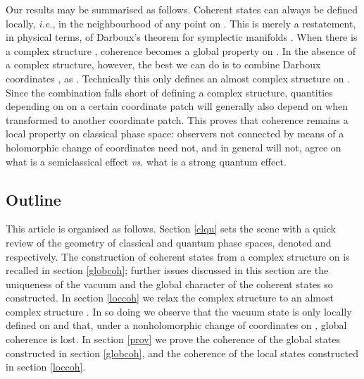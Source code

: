 \documentclass[a4paper,a4paper]{article}
\begin{document}
Our results may be summarised as follows. Coherent states can always 
be defined locally, {\it i.e.}, in the neighbourhood of any point  on \coordHE{}. 
This is merely a restatement, in physical terms, of Darboux's theorem for symplectic 
manifolds \cite{ARNOLD}. When there is a complex 
structure \coordHE{}, coherence becomes a global property on \coordHE{}. 
In the absence of a complex structure, however, the best we can do 
is to combine Darboux coordinates \coordHE{}, \coordHE{} as \coordHE{}. 
Technically this only defines an almost complex structure \coordHE{} on \coordHE{}
\cite{KN}. Since the combination \coordHE{} 
falls short of defining a complex structure, quantities depending on \coordHE{} 
on a certain coordinate patch will generally also depend on \coordHE{} 
when transformed to another coordinate patch. This proves that coherence remains 
a local property on classical phase space: observers not connected by means of 
a holomorphic change of coordinates need not, and in general will not,
agree on what is a semiclassical effect {\it vs.} what is a strong quantum effect. 

\subsection{Outline}\label{outline}

This article is organised as follows. Section \ref{clqu} sets the scene 
with a quick review of the geometry of classical and quantum phase spaces, 
denoted  \coordHE{} and \coordHE{} respectively. The construction of coherent 
states from a complex structure \coordHE{} on \coordHE{} is recalled 
in section \ref{globcoh}; further issues discussed in this section are the 
uniqueness of the vacuum and the global character of the coherent states so constructed. 
In section \ref{loccoh} we relax the complex structure \coordHE{} 
to an almost complex structure \coordHE{}. In so doing we observe that the 
vacuum state is only locally defined on \coordHE{} and that, under a nonholomorphic 
change of coordinates on \coordHE{}, global coherence is lost. In section \ref{prov} 
we prove the coherence of the global states constructed in section \ref{globcoh}, 
and the coherence of the local states constructed in section \ref{loccoh}.
\end{document}
